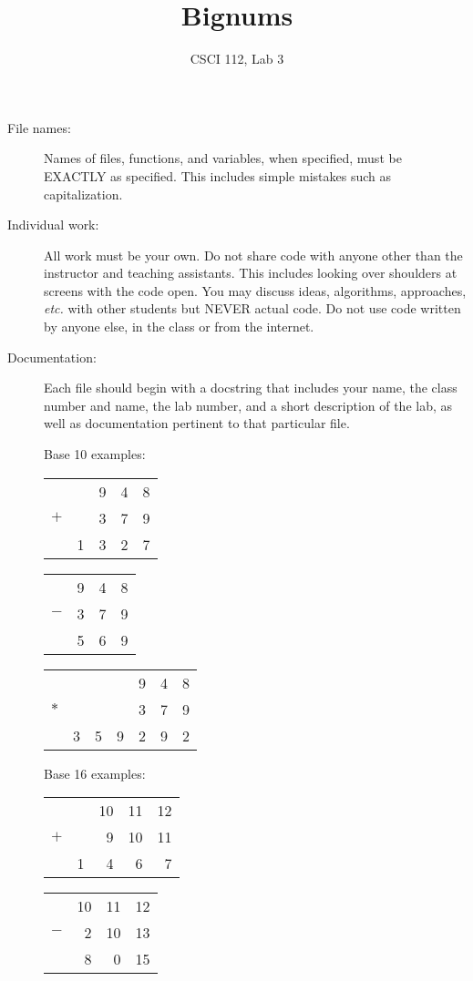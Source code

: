 \documentclass{article}
\title{Bignums}
\author{CSCI 112, Lab 3}
\date{}
\begin{document}
\sloppy

\maketitle

\begin{description} 
\item[File names:]  Names of files, functions, and variables, 
when specified,
must be EXACTLY as specified.  This includes simple mistakes such
as capitalization.

\item[Individual work:]  All work must be your own.  Do not share
code with anyone other than the instructor and teaching assistants.
This includes looking over shoulders at screens with the code open.
You may discuss ideas, algorithms, approaches, {\em etc.} with
other students but NEVER actual code.  Do not use code
written by anyone else, in the class or from the internet.

\item[Documentation:] Each file should begin with a docstring
that includes your name, the class number and name, the lab
number, and  
a short description of the lab, as well as documentation pertinent
to that particular file.

Base 10 examples:
\begin{tabular}{rrrrr}
      &       &     9 &     4 &     8\\
  $+$ &       &     3 &     7 &     9\\
\hline
      &     1 &     3 &     2 &     7\\
\end{tabular}\hfill
\begin{tabular}{rrrr}
      &     9 &     4 &     8\\
  $-$ &     3 &     7 &     9\\
\hline
      &     5 &     6 &     9\\
\end{tabular}\hfill
\begin{tabular}{rrrrrrr}
      &       &       &       &     9 &     4 &     8\\
  $*$ &       &       &       &     3 &     7 &     9\\
\hline
      &     3 &     5 &     9 &     2 &     9 &     2\\
\end{tabular}


Base 16 examples:
\begin{tabular}{rrrrr}
      &       &    10 &    11 &    12\\
  $+$ &       &     9 &    10 &    11\\
\hline
      &     1 &     4 &     6 &     7\\
\end{tabular}\hspace{1in}
\begin{tabular}{rrrr}
      &    10 &    11 &    12\\
  $-$ &     2 &    10 &    13\\
\hline
      &     8 &     0 &    15\\
\end{tabular}


\end{description}
\end{document}
